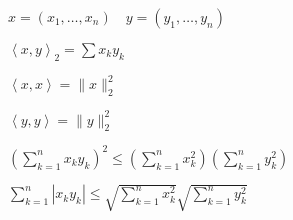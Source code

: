   \begin{statement}

        $x = (x_1, \ldots, x_{n} )\quad y = (y_1, \ldots, y_{n} )$

        $\left<x, y \right>_2 = \sum x_ky_k$

        $\left<x, x \right> = \|x\|_2^2$

        $\left<y, y \right> = \|y\|_2^2$

        $\left( \sum_{k=1}^{n} x_ky_k \right) ^2 \leqslant \left( \sum_{k=1}^{n} x_k^2 \right) \left( \sum_{k=1}^{n} y_k^2 \right) $

        $\sum_{k=1}^{n} |x_ky_k|\leqslant \sqrt{\sum_{k=1}^{n} x_k^2} \sqrt{\sum_{k=1}^{n} y_k^2} $
    \end{statement}

